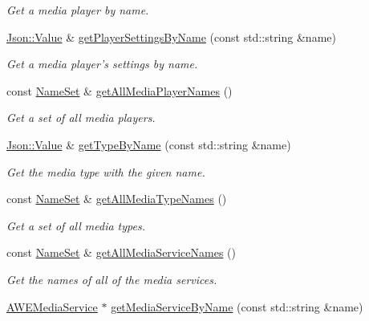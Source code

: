 \begin{DoxyCompactItemize}
\begin{DoxyCompactList}\small\item\em Get a media player by name. \end{DoxyCompactList}\item 
\hyperlink{class_json_1_1_value}{Json\-::\-Value} \& \hyperlink{class_a_w_e_global_settings_a91e38e1a304d2a22d2ed09970e93931b}{get\-Player\-Settings\-By\-Name} (const std\-::string \&name)
\begin{DoxyCompactList}\small\item\em Get a media player's settings by name. \end{DoxyCompactList}\item 
const \hyperlink{class_a_w_e_global_settings_a62d5ef5b82be32d6f025abe839436aba}{Name\-Set} \& \hyperlink{class_a_w_e_global_settings_aa24c9b71432fedcd153bdce2232c78ea}{get\-All\-Media\-Player\-Names} ()
\begin{DoxyCompactList}\small\item\em Get a set of all media players. \end{DoxyCompactList}\item 
\hyperlink{class_json_1_1_value}{Json\-::\-Value} \& \hyperlink{class_a_w_e_global_settings_a843e76cd97ebd46bc9783adeb2de9299}{get\-Type\-By\-Name} (const std\-::string \&name)
\begin{DoxyCompactList}\small\item\em Get the media type with the given name. \end{DoxyCompactList}\item 
const \hyperlink{class_a_w_e_global_settings_a62d5ef5b82be32d6f025abe839436aba}{Name\-Set} \& \hyperlink{class_a_w_e_global_settings_acfa7072b65ab092113c3fd46149e0398}{get\-All\-Media\-Type\-Names} ()
\begin{DoxyCompactList}\small\item\em Get a set of all media types. \end{DoxyCompactList}\item 
const \hyperlink{class_a_w_e_global_settings_a62d5ef5b82be32d6f025abe839436aba}{Name\-Set} \& \hyperlink{class_a_w_e_global_settings_a65624f2271786d7cd14dc681f505dcd1}{get\-All\-Media\-Service\-Names} ()
\begin{DoxyCompactList}\small\item\em Get the names of all of the media services. \end{DoxyCompactList}\item 
\hyperlink{class_a_w_e_media_service}{A\-W\-E\-Media\-Service} $\ast$ \hyperlink{class_a_w_e_global_settings_a6dd183891fd51c88fdf4cf0b29d94155}{get\-Media\-Service\-By\-Name} (const std\-::string \&name)

\end{DoxyCompactItemize}
